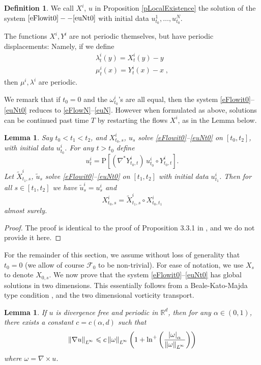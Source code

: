 \documentclass[final]{amsart}%
\newcommand{\mceuler}{\eqref{eFlowN}--\eqref{euN}\xspace}
\newcommand{\mceulert}{\eqref{eFlowit0}--\eqref{euNt0}\xspace}
\newcommand{\transpose}{^*}
\newcommand{\grad}{\nabla}
\newcommand{\gradt}{\grad\transpose}
\newcommand{\curl}{\grad \times}
\renewcommand{\leq}{\leqslant}
\newcommand{\F}{\mathcal{F}}
\newcommand{\lhp}{\boldsymbol{\mathrm{P}}}
\newcommand{\R}{\mathbb{R}}
\newif\iftextstyle
\newcommand{\abs}[1]{\iftextstyle\lvert#1\rvert\else\left\lvert#1\right\rvert\fi}
\newcommand{\norm}[1]{\iftextstyle\lVert#1\rVert\else\left\lVert#1\right\rVert\fi}
\newcommand{\holdersnorm}[2]{\abs{#1}_{#2}}
\newcommand{\lpnorm}[2]{\norm{#1}_{\smash{L^{\!#2}_{\vphantom{h}}}\vphantom{L^{\!#2}}}}
\newcommand{\linfnorm}[1]{\lpnorm{#1}{\infty}}
\numberwithin{equation}{section}
\newtheorem{lemma}[theorem]{Lemma}
\theoremstyle{definition}
\newtheorem{definition}[theorem]{Definition}
\theoremstyle{remark}
\begin{document}
\begin{definition}%
  We call $X^i$, $u$ in Proposition \ref{pLocalExistence} the solution
  of the system $\mceulert$ with initial data $u^1_{t_0}, \dots,
  u^N_{t_0}$.
\end{definition}%

The functions $X^i, Y^i$ are not periodic themselves, but have
periodic displacements: Namely, if we define
\begin{gather}
\label{eLambdai} \lambda^i_t(y) = X^i_t(y) - y\\
\label{eMui} \mu^i_t(x) = Y^i_t(x) - x\;,
\end{gather}
then $\mu^i, \lambda^i$ are periodic.

We remark that if $t_0 = 0$ and the $\omega^i_{t_0}$'s are all equal,
then the system \mceulert reduces to \mceuler. However when formulated
as above, solutions can be continued past time $T$ by restarting the
flows $X^i$, as in the Lemma below.

\begin{lemma}\label{lMarkov}%
  Say $t_0 < t_1 < t_2$, and $X^i_{t_0,s}$, $u_s$ solve \mceulert on
  $[t_0, t_2]$, with initial data $u^i_{t_0}$. For any $t > t_0$
  define
$$
u^i_t = \lhp \left[ (\gradt Y^i_{t_0, t}) \, u^i_{t_0} \circ
  Y^i_{t_0,t} \right].
$$
Let $\tilde X^i_{t_1,s}$, $\tilde u_s$ solve \mceulert on $[t_1, t_2]$
with initial data $u^i_{t_1}$. Then for all $s \in [t_1, t_2]$ we have
$\tilde u_s^i = u^i_s$ and
$$
X^i_{t_0,s} = \tilde X^i_{t_1, s} \circ X^i_{t_0, t_1}
$$
almost surely.
\end{lemma}%

\begin{proof}
  The proof is identical to the proof of Proposition 3.3.1 in
  \cite{thesis}, and we do not provide it here.
\end{proof}

For the remainder of this section, we assume without loss of
generality that $t_0 = 0$ (we allow of course $\F_0$ to be
non-trivial). For ease of notation, we use $X_s$ to denote
$X_{0,s}$. We now prove that the system \mceulert has global solutions
in two dimensions. This essentially follows from a Beale-Kato-Majda
type condition \cite{bkm}, and the two dimensional vorticity
transport.

\begin{lemma}\label{lSIOlogBound}%
  If $u$ is divergence free and periodic in $\R^d$, then for any
  $\alpha \in (0,1)$, there exists a constant $c = c(\alpha, d)$ such
  that
$$
\linfnorm{\grad u} \leq c \linfnorm{\omega} \left( 1 + \ln^+ \left(
    \frac{ \holdersnorm{\omega}{\alpha} }{ \linfnorm{\omega} } \right)
\right)
$$
where $\omega = \curl u$.
\end{lemma}%
\end{document}
